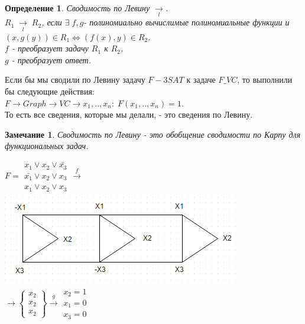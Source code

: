 \documentclass{beamer}
\theoremstyle{plain}
\newtheorem{rmk}[thm]{Замечание}
\newtheorem{dfn}[thm]{Определение}
\theoremstyle{definition}
\begin{document}
\begin{frame}
    \begin{dfn}
        Сводимость по Левину $\underset{l}{\rightarrow}$. \\
        $R_{1} \; \underset{l}{\rightarrow} \; R_{2}$, если $\exists \; f,g$- полиномиально вычислимые полиномиальные функции и $(x, g(y)) \in R_{1} \Leftrightarrow (f(x), y) \in R_{2}$. \\
        $f$ - преобразует задачу $R_{1}$ к $R_{2}$,\\
        $g$ - преобразует ответ.
    \end{dfn}
    Если бы мы сводили по Левину задачу $F-3SAT$ к задаче $F\_VC$, то выполнили бы следующие действия: \\
    $F \rightarrow Graph \rightarrow VC \rightarrow x_{1}, .., x_{n}: \; F(x_{1}, .., x_{n})=1$. \\ То есть все сведения, которые мы делали, - это сведения по Левину. \\
    \begin{rmk}
        Сводимость по Левину - это обобщение сводимости по Карпу для функциональных задач.
    \end{rmk}
\end{frame}

\begin{frame}
    $F = \begin{matrix}x_{1} \vee x_{2} \vee \bar{x_{3}} \\ 
    \bar{x_{1}} \vee x_{2} \vee x_{3} \\ x_{1} \vee x_{2} \vee x_{3} 
    \end{matrix} \overset{f}{\rightarrow}$ \\
    \includegraphics{scheme2} \\ $\rightarrow \begin{Bmatrix} x_{2}\\ x_{2}\\ x_{2} \end{Bmatrix} \overset{g}{\rightarrow} \begin{matrix} x_{2}=1\\ x_{1}=0\\ x_{3}=0 \end{matrix}$
    
\end{frame}
\end{document}
